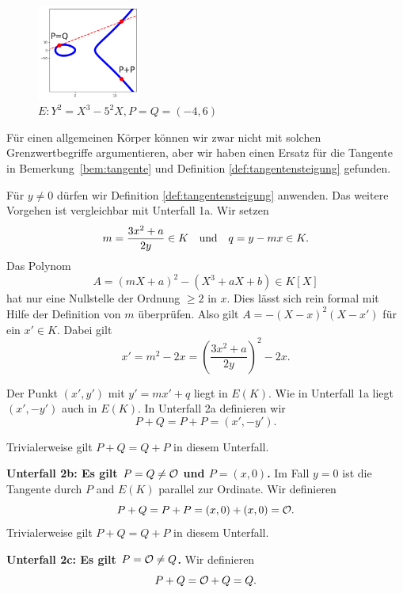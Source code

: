 \begin{figure}
  \centering    
  \caption{$E: Y^2 = X^3-5^2 X,P = Q=(-4,6)$}
  \label{fig:unterfall2a}
  \includegraphics[width=0.3\textwidth]{./plots/unterfall2a.png}
\end{figure}

Für einen allgemeinen Körper können wir zwar nicht mit solchen
Grenzwertbegriffe argumentieren, aber wir haben einen Ersatz für die
Tangente in Bemerkung~\ref{bem:tangente} und Definition
\ref{def:tangentensteigung}
gefunden.


Für $y\not=0$ dürfen wir  Definition \ref{def:tangentensteigung}
anwenden. Das weitere Vorgehen ist vergleichbar mit Unterfall 1a.
Wir setzen
$$m =  \frac{3x^2+a}{2y}\in K\quad\text{und}\quad q = y-mx\in K.$$
Das Polynom
$$
A = (mX+a)^2 - (X^3+aX+b) \in K[X]
$$
hat nur eine Nullstelle der Ordnung $\ge 2$ in $x$. Dies lässt sich
rein formal mit Hilfe der Definition von $m$ überprüfen.
Also gilt $A = -(X-x)^2(X-x')$ für ein $x'\in K$. Dabei gilt
\begin{equation*}
  x' = m^2 - 2x = \left(\frac{3x^2+a}{2y}\right)^2 - 2x. 
\end{equation*}

Der Punkt $(x',y')$ mit $y'=mx'+q$ liegt in $E(K)$. Wie in Unterfall
1a liegt $(x',-y')$ auch in $E(K)$. 
In Unterfall 2a
definieren wir
\begin{equation*}
  P+Q = P+P = \left(x',-y'\right).
\end{equation*}

Trivialerweise gilt $P+Q=Q+P$ in diesem Unterfall.

\textbf{Unterfall 2b: Es gilt $P=Q\not={\mathcal O}$ und $P=(x,0)$.}
Im Fall $y=0$ ist die Tangente durch $P$ and $E(K)$ parallel zur
Ordinate. Wir 
definieren
\begin{equation*}
  P+Q = P+P = (x,0)+(x,0) = {\mathcal O}. 
\end{equation*}
Trivialerweise gilt $P+Q=Q+P$ in diesem Unterfall.

\textbf{Unterfall 2c: Es gilt $P={\mathcal O}\not=Q$.}
Wir definieren 
\begin{equation*}
  P+Q = {\mathcal O} + Q = Q. 
\end{equation*}


